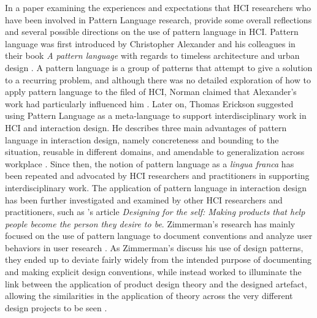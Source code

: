 In a paper examining the experiences and expectations that HCI researchers who have been involved in Pattern Language research, \autocite{pan_pattern_2013} provide some overall reflections and several possible directions on the use of pattern language in HCI. Pattern language was first introduced by Christopher Alexander and his colleagues in their book \emph{A pattern language} with regards to timeless architecture and urban design \autocite{pattern_language_1977}. A pattern language is a group of patterns that attempt to give a solution to a recurring problem, and although there was no detailed exploration of how to apply pattern language to the filed of HCI, Norman claimed that Alexander’s work had particularly influenced him \autocite[p. 1990]{pan_pattern_2013}. Later on, Thomas Erickson suggested using Pattern Language as a meta-language to support interdisciplinary work in HCI and interaction design. He describes three main advantages of pattern language in interaction design, namely concreteness and bounding to the situation, reusable in different domains, and amendable to generalization across workplace \autocite[p. 1991]{pan_pattern_2013}. Since then, the notion of pattern language as a \emph{lingua franca} has been repeated and advocated by HCI researchers and practitioners in supporting interdisciplinary work. The application of pattern language in interaction design has been further investigated and examined by other HCI researchers and practitioners, such as \autocite{zimmerman_designing_2009}'s article \textit{Designing for the self: Making products that help people become the person they desire to be}. Zimmerman's research has mainly focused on the use of pattern language to document conventions and analyze user behaviors in user research \autocite[p. 1991]{pan_pattern_2013}. As Zimmerman's discuss his use of design patterns, they ended up to deviate fairly widely from the intended purpose of documenting and making explicit design conventions, while instead worked to illuminate the link between the application of product design theory and the designed artefact, allowing the similarities in the application of theory across the very different design projects to be seen \autocite[p. 402]{zimmerman_designing_2009}.


